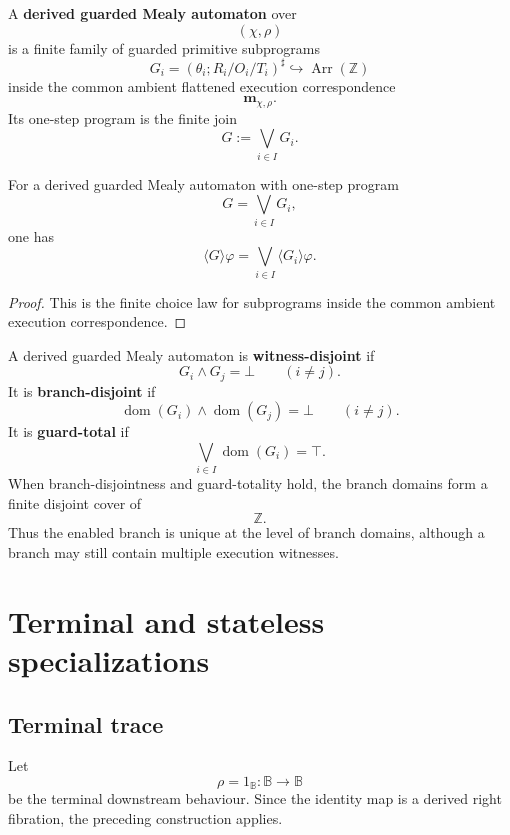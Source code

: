 \begin{definition}
\label{def:derived-poly-guarded-mealy-automaton}
A \textbf{derived guarded Mealy automaton} over
\[
(\chi,\rho)
\]
is a finite family of guarded primitive subprograms
\[
G_i
=
(\theta_i;R_i/O_i/T_i)^\sharp
\hookrightarrow
\operatorname{Arr}(\mathbb Z)
\]
inside the common ambient flattened execution correspondence
\[
\mathbf m_{\chi,\rho}.
\]
Its one-step program is the finite join
\[
G:=\bigvee_{i\in I}G_i.
\]
\end{definition}

\begin{proposition}
\label{prop:derived-poly-guarded-automaton-diamond}
For a derived guarded Mealy automaton with one-step program
\[
G=\bigvee_{i\in I}G_i,
\]
one has
\[
\langle G\rangle\varphi
=
\bigvee_{i\in I}\langle G_i\rangle\varphi.
\]
\end{proposition}

\begin{proof}
This is the finite choice law for subprograms inside the common ambient
execution correspondence.
\end{proof}

A derived guarded Mealy automaton is \textbf{witness-disjoint} if
\[
G_i\wedge G_j=\bot
\qquad
(i\ne j).
\]
It is \textbf{branch-disjoint} if
\[
\operatorname{dom}(G_i)\wedge\operatorname{dom}(G_j)=\bot
\qquad
(i\ne j).
\]
It is \textbf{guard-total} if
\[
\bigvee_{i\in I}\operatorname{dom}(G_i)=\top.
\]
When branch-disjointness and guard-totality hold, the branch domains form a
finite disjoint cover of
\[
\mathbb Z.
\]
Thus the enabled branch is unique at the level of branch domains, although a
branch may still contain multiple execution witnesses.

\section{Terminal and stateless specializations}
\label{sec:derived-poly-terminal-stateless}

\subsection{Terminal trace}

Let
\[
\rho=1_{\mathbb B}:\mathbb B\to\mathbb B
\]
be the terminal downstream behaviour.  Since the identity map is a derived
right fibration, the preceding construction applies.

